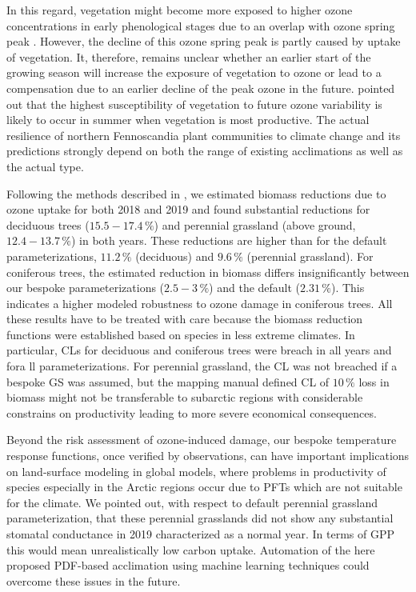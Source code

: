 \documentclass[bg, manuscript]{copernicus}
\begin{document}
In this regard, vegetation might become more exposed to higher ozone concentrations in early phenological stages due to an overlap with ozone spring peak \citep{EP:Karlsson2007}. However, the decline of this ozone spring peak is partly caused by uptake of vegetation. It, therefore, remains unclear whether an earlier start of the growing season will increase the exposure of vegetation to ozone or lead to a compensation due to an earlier decline of the peak ozone in the future. \citet{ESPR:Hayes2021} pointed out that the highest susceptibility of vegetation to future ozone variability is likely to occur in summer when vegetation is most productive. The actual resilience of northern Fennoscandia plant communities to climate change and its predictions strongly depend on both the range of existing acclimations as well as the actual type. 

Following the methods described in \citet{ICP:MappingManual2017}, we estimated biomass reductions due to ozone uptake for both 2018 and 2019 and found substantial reductions for deciduous trees ($15.5-17.4\,\unit{\%}$) and perennial grassland (above ground, $12.4-13.7\,\unit{\%}$) in both years. These reductions are higher than for the default parameterizations, $11.2\,\unit{\%}$ (deciduous) and $9.6\,\unit{\%}$ (perennial grassland). For coniferous trees, the estimated reduction in biomass differs insignificantly between our bespoke parameterizations ($2.5-3\,\unit{\%}$) and the default ($2.31\,\unit{\%}$). This indicates a higher modeled robustness to ozone damage in coniferous trees. All these results have to be treated with care because the biomass reduction functions were established based on species in less extreme climates. In particular, CLs for deciduous and coniferous trees were breach in all years and fora ll parameterizations. For perennial grassland, the CL was not breached if a bespoke GS was assumed, but the mapping manual defined CL of $10\,\unit{\%}$ loss in biomass might not be transferable to subarctic regions with considerable constrains on productivity leading to more severe economical consequences.

Beyond the risk assessment of ozone-induced damage, our bespoke temperature response functions, once verified by observations, can have important implications on land-surface modeling in global models, where problems in productivity of species especially in the Arctic regions occur due to PFTs which are not suitable for the climate. We pointed out, with respect to default perennial grassland parameterization, that these perennial grasslands did not show any substantial stomatal conductance in 2019 characterized as a normal year. In terms of GPP this would mean unrealistically low carbon uptake. Automation of the here proposed PDF-based acclimation using machine learning techniques could overcome these issues in the future.
\end{document}
